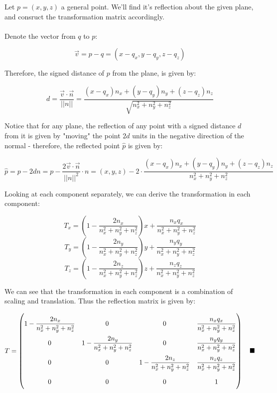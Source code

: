\documentclass{article}
\newcommand{\proofend}{\quad\blacksquare}
\newcommand{\norm}[1]{\vert\vert#1\vert\vert}
\begin{document}
\begin{enumerate}
    Let $p=(x,y,z)$ a general point. We'll find it's reflection about the given plane, and consruct the transformation matrix accordingly.\\\\
    Denote the vector from $q$ to $p$:

    $$\vec{v} = p - q = (x-q_x, y-q_y, z-q_z)$$

    Therefore, the signed distance of $p$ from the plane, is given by:

    $$d = \frac{\vec{v}\cdot \vec{n}}{\norm{n}} = \frac{(x-q_x)n_x+(y-q_y)n_y+(z-q_z)n_z}{\sqrt{n_x^2+n_y^2+n_z^2}}$$

    Notice that for any plane, the reflection of any point with a signed distance $d$ from it is given by "moving" the point $2d$ units in the negative direction of the normal - therefore, the reflected point $\hat{p}$ is given by:

    $$\hat{p} = p - 2dn = p-\frac{2\vec{v}\cdot\vec{n}}{\norm{n}^2}\cdot n = (x,y,z) - 2\cdot\frac{(x-q_x)n_x+(y-q_y)n_y+(z-q_z)n_z}{n_x^2+n_y^2+n_z^2}$$

    Looking at each component separately, we can derive the transformation in each component:

    $$
        T_x = \left(1-\frac{2n_x}{n_x^2+n_y^2+n_z^2}\right)x + \frac{n_xq_x}{n_x^2+n_y^2+n_z^2}
    $$
    $$
        T_y = \left(1-\frac{2n_y}{n_x^2+n_y^2+n_z^2}\right)y + \frac{n_yq_y}{n_x^2+n_y^2+n_z^2}
    $$
    $$
        T_z = \left(1-\frac{2n_z}{n_x^2+n_y^2+n_z^2}\right)z + \frac{n_zq_z}{n_x^2+n_y^2+n_z^2}
    $$

    We can see that the transformation in each component is a combination of scaling and translation. Thus the reflection matrix is given by:

    $$
        \begingroup
            \renewcommand*{\arraystretch}{2.2}
            T = \begin{pmatrix}
                1-\dfrac{2n_x}{n_x^2+n_y^2+n_z^2}&0&0&\dfrac{n_xq_x}{n_x^2+n_y^2+n_z^2}\\
                0&1-\dfrac{2n_y}{n_x^2+n_y^2+n_z^2}&0&\dfrac{n_yq_y}{n_x^2+n_y^2+n_z^2}\\
                0&0&1-\dfrac{2n_z}{n_x^2+n_y^2+n_z^2}&\dfrac{n_zq_z}{n_x^2+n_y^2+n_z^2}\\
                0&0&0&1
            \end{pmatrix}
        \endgroup\proofend
    $$
    \end{enumerate}
\end{document}
